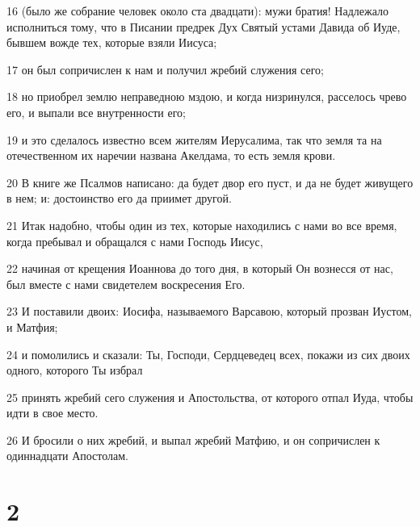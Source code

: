 \par 16 (было же собрание человек около ста двадцати): мужи братия! Надлежало исполниться тому, что в Писании предрек Дух Святый устами Давида об Иуде, бывшем вожде тех, которые взяли Иисуса;
\par 17 он был сопричислен к нам и получил жребий служения сего;
\par 18 но приобрел землю неправедною мздою, и когда низринулся, расселось чрево его, и выпали все внутренности его;
\par 19 и это сделалось известно всем жителям Иерусалима, так что земля та на отечественном их наречии названа Акелдама, то есть земля крови.
\par 20 В книге же Псалмов написано: да будет двор его пуст, и да не будет живущего в нем; и: достоинство его да приимет другой.
\par 21 Итак надобно, чтобы один из тех, которые находились с нами во все время, когда пребывал и обращался с нами Господь Иисус,
\par 22 начиная от крещения Иоаннова до того дня, в который Он вознесся от нас, был вместе с нами свидетелем воскресения Его.
\par 23 И поставили двоих: Иосифа, называемого Варсавою, который прозван Иустом, и Матфия;
\par 24 и помолились и сказали: Ты, Господи, Сердцеведец всех, покажи из сих двоих одного, которого Ты избрал
\par 25 принять жребий сего служения и Апостольства, от которого отпал Иуда, чтобы идти в свое место.
\par 26 И бросили о них жребий, и выпал жребий Матфию, и он сопричислен к одиннадцати Апостолам.

\chapter{2}

